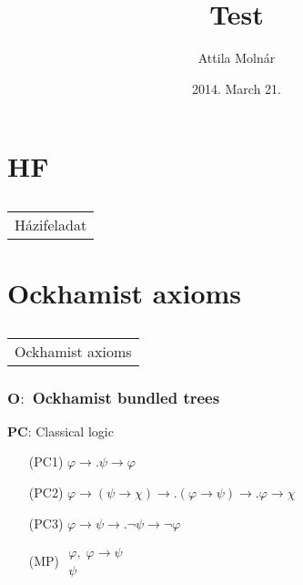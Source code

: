 \documentclass[xcolor=x11names]{beamer}
\author{Attila Moln\'ar}
\date{2014. March 21.}
\title{Test}
\institute{ELTE}
\makeatletter
\let\beamer@writeslidentry@miniframeson=\beamer@writeslidentry
\def\beamer@writeslidentry@miniframesoff{%
  \expandafter\beamer@ifempty\expandafter{\beamer@framestartpage}{}%
  {%
    \clearpage\beamer@notesactions%
  }
}
\newcommand*{\miniframeson}{\let\beamer@writeslidentry=\beamer@writeslidentry@miniframeson}
\newcommand*{\miniframesoff}{\let\beamer@writeslidentry=\beamer@writeslidentry@miniframesoff}
\newcommand{\cimdia}[1] {\miniframesoff \begin{frame}\begin{center}\huge \begin{tabular}{c}#1\end{tabular}\end{center}\end{frame}\miniframeson}
\newcommand{\szakasz}[2][]{\section{#1}\subsection{}\cimdia{#2}}
\newcommand{\bemph}[1] {{\color{DeepSkyBlue3}{#1}}}
\newcommand{\FD}{\mathbf F}
\newcommand{\PD}{\mathbf P}
\renewcommand{\Diamond}{\scalebox{.9}{\raisebox{-.4ex}{\rotatebox{45}{$\Box$}}}}
\newcommand{\lrule}[3][c]{\begin{array}{#1} #2  \\  \hline #3 \end{array}}
\newcommand{\defegy}[1][.1]{\hspace{#1cm}\overset{\textup{\tiny def}}{=}\hspace{#1cm}}
\newcommand{\lthen}{\rightarrow}
\makeatother
\begin{document}
\footnotesize


\szakasz[HF]{Házifeladat}

\szakasz[Ockhamist axioms]{Ockhamist axioms}

\begin{frame}[t]
\frametitle{$\mathbf O:$%
Ockhamist bundled trees}
\scriptsize
\begin{minipage}[t]{5.78cm}
$\mathbf{PC}$: {Classical logic}
\begin{itemize}
\item[(PC1)] $\varphi \lthen .\psi \lthen \varphi$
\item[(PC2)] $\varphi\lthen (\psi \lthen \chi) \lthen\!\!. (\varphi \lthen \psi) \lthen\!\! . \varphi \lthen \chi$
\item[(PC3)] $\varphi \lthen \psi \lthen .\lnot \psi \lthen \lnot \varphi$
\item[(MP)] $\lrule {\varphi , \; \varphi \lthen \psi}{\psi}$
\end{itemize}
\pause %
\bemph{\hrule}
\smallskip


\end{minipage}
\end{frame}
\end{document}
